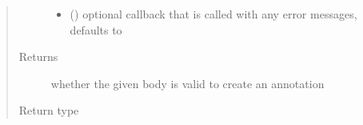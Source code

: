 \documentclass[letterpaper,10pt,english]{sphinxmanual}
\begin{document}
\begin{fulllineitems}
\begin{quote}
\begin{description}
\begin{itemize}
\item {} 
\sphinxAtStartPar
{} (\sphinxstyleliteralemphasis{\sphinxupquote{, }}) \textendash{} optional callback that is called with any error messages, defaults to 

\end{itemize}

\item[{Returns}] \leavevmode
\sphinxAtStartPar
whether the given body is valid to create an annotation

\item[{Return type}] \leavevmode
\sphinxAtStartPar
{}

\end{description}\end{quote}

\end{fulllineitems}

\end{document}
